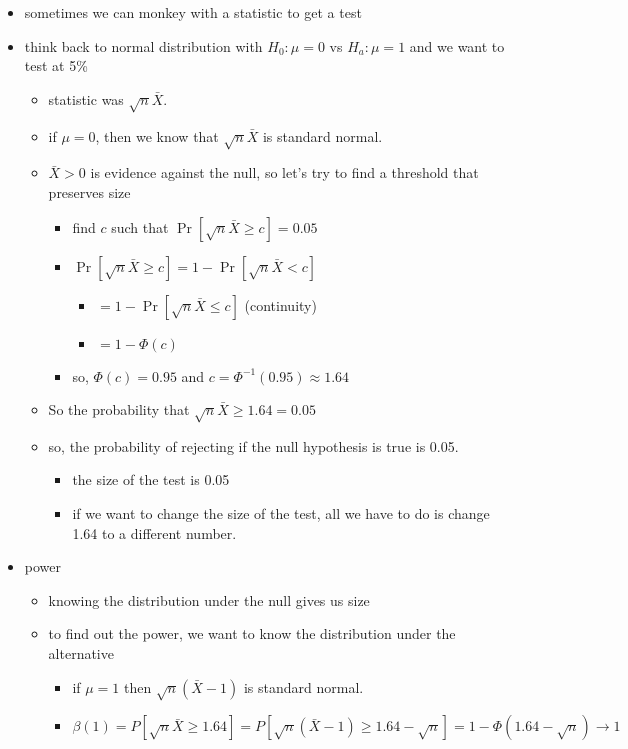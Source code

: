 \begin{itemize}
\item sometimes we can monkey with a statistic to get a test
\item think back to normal distribution with $H_0: \mu = 0$ vs
       $H_a: \mu = 1$ and we want to test at 5\%
\begin{itemize}
\item statistic was $\sqrt{n} \bar X$.
\item if $\mu = 0$, then we know that $\sqrt{n} \bar X$ is standard normal.
\item $\bar X > 0$ is evidence against the null, so let's try to
         find a threshold that preserves size
\begin{itemize}
\item find $c$ such that $\Pr[\sqrt{n} \bar X \geq c] = 0.05$
\item $\Pr[\sqrt{n} \bar X \geq c] = 1 - \Pr[\sqrt{n} \bar X < c]$
\begin{itemize}
\item $= 1 - \Pr[\sqrt{n} \bar X \leq c]$ (continuity)
\item $= 1 - \Phi(c)$
\end{itemize}
\item so, $\Phi(c) = 0.95$ and $c = \Phi^{-1}(0.95) \approx 1.64$
\end{itemize}
\item So the probability that $\sqrt{n} \bar X \geq 1.64 = 0.05$
\item so, the probability of rejecting if the null hypothesis is
         true is 0.05.
\begin{itemize}
\item the size of the test is 0.05
\item if we want to change the size of the test, all we have to
           do is change 1.64 to a different number.
\end{itemize}
\end{itemize}
\item power
\begin{itemize}
\item knowing the distribution under the null gives us size
\item to find out the power, we want to know the distribution under
         the alternative
\begin{itemize}
\item if $\mu = 1$ then $\sqrt{n}(\bar X - 1)$ is standard normal.
\item $\beta(1) = P[\sqrt{n} \bar X \geq 1.64] = P[\sqrt{n}(\bar
           X - 1) \geq 1.64 - \sqrt{n}] = 1 - \Phi(1.64 - \sqrt{n}) \to 1$
\end{itemize}
\end{itemize}
\end{itemize}
